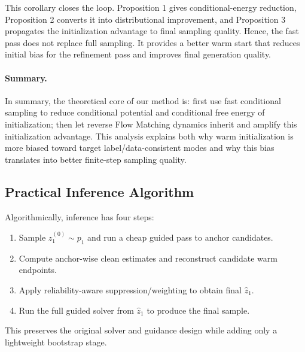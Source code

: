 \documentclass[letterpaper]{article} %
\begin{document}
This corollary closes the loop.
Proposition 1 gives conditional-energy reduction, Proposition 2 converts it into distributional improvement,
and Proposition 3 propagates the initialization advantage to final sampling quality.
Hence, the fast pass does not replace full sampling.
It provides a better warm start that reduces initial bias for the refinement pass and improves final generation quality.

\paragraph{Summary.}
In summary, the theoretical core of our method is: first use fast conditional sampling to reduce conditional potential and conditional free energy of initialization; then let reverse Flow Matching dynamics inherit and amplify this initialization advantage. This analysis explains both why warm initialization is more biased toward target label/data-consistent modes and why this bias translates into better finite-step sampling quality.

\subsection{Practical Inference Algorithm}

Algorithmically, inference has four steps:
\begin{enumerate}
\item Sample $z_1^{(0)}\sim p_1$ and run a cheap guided pass to anchor candidates.
\item Compute anchor-wise clean estimates and reconstruct candidate warm endpoints.
\item Apply reliability-aware suppression/weighting to obtain final $\hat z_1$.
\item Run the full guided solver from $\hat z_1$ to produce the final sample.
\end{enumerate}
This preserves the original solver and guidance design while adding only a lightweight bootstrap stage.
\end{document}
